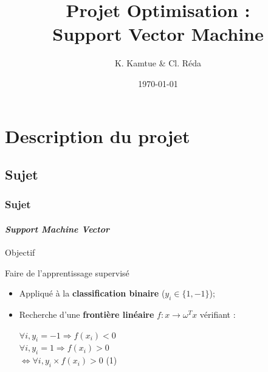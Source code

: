 \documentclass{beamer}
\title{Projet Optimisation :\\Support Vector Machine}
\author{K. Kamtue \& Cl. Réda}
\institute{\textsc{ENS Cachan}}
\date{\today}
\begin{document}
\maketitle
\tableofcontents
\setlength{\parindent}{1cm}

\section{Description du projet}

\subsection{Sujet}

\begin{frame}
\tableofcontents[currentsubsection]
\end{frame}

\begin{frame}
\frametitle{Sujet}
\framesubtitle{\emph{Support Machine Vector}}

\begin{alertblock}{Objectif}
\begin{center}
Faire de l'apprentissage supervisé
\end{center}
\end{alertblock}

\pause

\begin{itemize}
\item Appliqué à la \textbf{classification binaire} ($y_i \in \{1, -1\}$);

\pause

\item Recherche d'une \textbf{frontière linéaire} $f : x \rightarrow \omega^Tx$ vérifiant :

         \begin{center}
         $\forall i, y_i = -1 \Rightarrow f(x_i) < 0$\\
         $\forall i, y_i = 1 \Rightarrow f(x_i) > 0$\\
         $\Leftrightarrow \forall i, y_i \times f(x_i) > 0$ (1)
         \end{center}
\end{itemize}

\end{frame}
\end{document}
